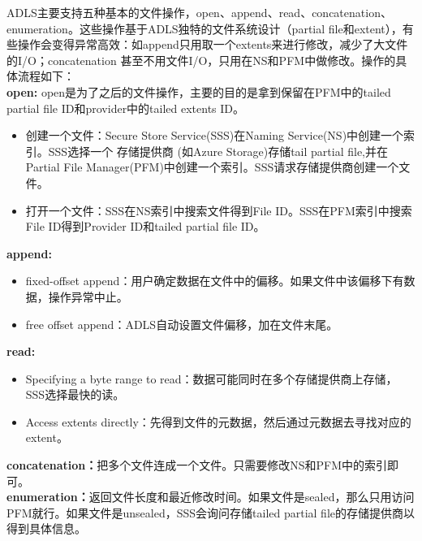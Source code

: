 ADLS主要支持五种基本的文件操作，open、append、read、concatenation、enumeration。这些操作基于ADLS独特的文件系统设计（partial file和extent），有些操作会变得异常高效：如append只用取一个extents来进行修改，减少了大文件的I/O；concatenation 甚至不用文件I/O，只用在NS和PFM中做修改。操作的具体流程如下：\\
\textbf{open:} 
open是为了之后的文件操作，主要的目的是拿到保留在PFM中的tailed partial file ID和provider中的tailed extents ID。
\begin{itemize}
	\item 创建一个文件：Secure Store Service(SSS)在Naming Service(NS)中创建一个索引。SSS选择一个 存储提供商 (如Azure Storage)存储tail partial file,并在Partial File Manager(PFM)中创建一个索引。SSS请求存储提供商创建一个文件。
	\item 打开一个文件：SSS在NS索引中搜索文件得到File ID。SSS在PFM索引中搜索File ID得到Provider ID和tailed partial file ID。
\end{itemize}
\textbf{append:}
\begin{itemize}
	\item fixed-offset append：用户确定数据在文件中的偏移。如果文件中该偏移下有数据，操作异常中止。
	\item free offset append：ADLS自动设置文件偏移，加在文件末尾。
\end{itemize}
\textbf{read:}
\begin{itemize}
	\item Specifying a byte range to read：数据可能同时在多个存储提供商上存储，SSS选择最快的读。
	\item Access extents directly：先得到文件的元数据，然后通过元数据去寻找对应的extent。
\end{itemize}
\textbf{concatenation：}把多个文件连成一个文件。只需要修改NS和PFM中的索引即可。\\
\textbf{enumeration：}返回文件长度和最近修改时间。如果文件是sealed，那么只用访问PFM就行。如果文件是unsealed，SSS会询问存储tailed partial file的存储提供商以得到具体信息。

